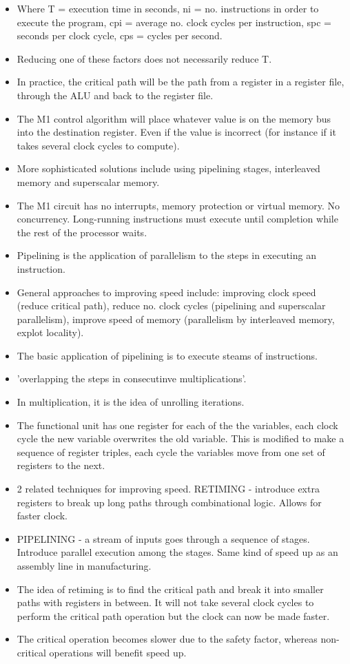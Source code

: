 \documentclass{article}
\begin{document}
\begin{itemize}
\item Where T = execution time in seconds, ni = no. instructions in order to execute the program, cpi = average no. clock cycles per instruction, spc = seconds per clock cycle, cps = cycles per second.
\item Reducing one of these factors does not necessarily reduce T.
\item In practice, the critical path will be the path from a register in a register file, through the ALU and back to the register file.
\item The M1 control algorithm will place whatever value is on the memory bus into the destination register. Even if the value is incorrect (for instance if it takes several clock cycles to compute).
\item More sophisticated solutions include using pipelining stages, interleaved memory and superscalar memory.
\item The M1 circuit has no interrupts, memory protection or virtual memory. No concurrency. Long-running instructions must execute until completion while the rest of the processor waits.
\item Pipelining is the application of parallelism to the steps in executing an instruction.
\item General approaches to improving speed include: improving clock speed (reduce critical path), reduce no. clock cycles (pipelining and superscalar parallelism), improve speed of memory (parallelism by interleaved memory, explot locality).
\item The basic application of pipelining is to execute steams of instructions.
\item 'overlapping the steps in consecutinve multiplications'.
\item In multiplication, it is the idea of unrolling iterations.
\item The functional unit has one register for each of the the variables, each clock cycle the new variable overwrites the old variable. This is modified to make a sequence of register triples, each cycle the variables move from one set of registers to the next.
\item 2 related techniques for improving speed. RETIMING - introduce extra registers to break up long paths through combinational logic. Allows for faster clock.
\item PIPELINING - a stream of inputs goes through a sequence of stages. Introduce parallel execution among the stages. Same kind of speed up as an assembly line in manufacturing.
\item The idea of retiming is to find the critical path and break it into smaller paths with registers in between. It will not take several clock cycles to perform the critical path operation but the clock can now be made faster.
\item The critical operation becomes slower due to the safety factor, whereas non-critical operations will benefit speed up.
\end{itemize}
\end{document}

